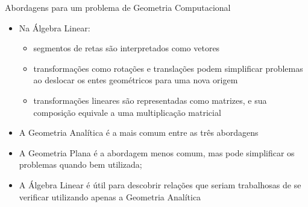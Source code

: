 \begin{frame}[fragile]{Abordagens para um problema de Geometria Computacional}

    \begin{itemize}
 
        \item Na Álgebra Linear: 
    
        \begin{itemize}
            \item segmentos de retas são interpretados como vetores
            \item transformações como rotações e translações podem simplificar problemas ao deslocar os entes geométricos para uma nova origem
            \item transformações lineares são representadas como matrizes, e sua composição equivale a uma multiplicação matricial
        \end{itemize}

        \item A Geometria Analítica é a mais comum entre as três abordagens

        \item A Geometria Plana é a abordagem menos comum, mas pode simplificar os problemas quando bem utilizada;
        \item A Álgebra Linear é útil para descobrir relações que seriam trabalhosas de se verificar utilizando apenas a Geometria Analítica
    \end{itemize}

\end{frame}
